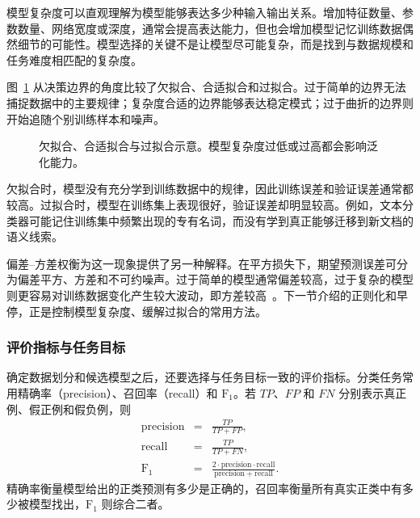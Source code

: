 模型复杂度可以直观理解为模型能够表达多少种输入输出关系。增加特征数量、参数数量、网络宽度或深度，通常会提高表达能力，但也会增加模型记忆训练数据偶然细节的可能性。模型选择的关键不是让模型尽可能复杂，而是找到与数据规模和任务难度相匹配的复杂度。

图~\ref{fig:nlpbook-underfitting-overfitting} 从决策边界的角度比较了欠拟合、合适拟合和过拟合。过于简单的边界无法捕捉数据中的主要规律；复杂度合适的边界能够表达稳定模式；过于曲折的边界则开始追随个别训练样本和噪声。


\begin{figure}[htbp]
  \centering
  
  \caption{欠拟合、合适拟合与过拟合示意。模型复杂度过低或过高都会影响泛化能力。}
  \label{fig:nlpbook-underfitting-overfitting}
\end{figure}

欠拟合时，模型没有充分学到训练数据中的规律，因此训练误差和验证误差通常都较高。过拟合时，模型在训练集上表现很好，验证误差却明显较高。例如，文本分类器可能记住训练集中频繁出现的专有名词，而没有学到真正能够迁移到新文档的语义线索。

偏差--方差权衡为这一现象提供了另一种解释。在平方损失下，期望预测误差可分为偏差平方、方差和不可约噪声。过于简单的模型通常偏差较高，过于复杂的模型则更容易对训练数据变化产生较大波动，即方差较高~\cite{GoodfellowEtAl2016DeepLearning}。下一节介绍的正则化和早停，正是控制模型复杂度、缓解过拟合的常用方法。

\subsubsection{评价指标与任务目标}

确定数据划分和候选模型之后，还要选择与任务目标一致的评价指标。分类任务常用精确率（precision）、召回率（recall）和 $\mathrm{F}_1$。若 $TP$、$FP$ 和 $FN$ 分别表示真正例、假正例和假负例，则
\begin{eqnarray}
\mathrm{precision} &=& \frac{TP}{TP+FP},\\
\mathrm{recall} &=& \frac{TP}{TP+FN},\\
\mathrm{F}_1 &=&
\frac{2\cdot\mathrm{precision}\cdot\mathrm{recall}}
{\mathrm{precision}+\mathrm{recall}}.
\end{eqnarray}
精确率衡量模型给出的正类预测有多少是正确的，召回率衡量所有真实正类中有多少被模型找出，$\mathrm{F}_1$ 则综合二者。

